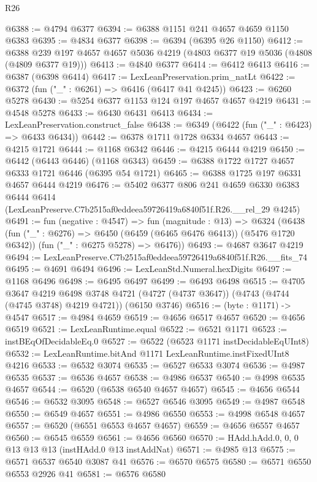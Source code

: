 \begin{lexlean}{R26}
\begin{coremodule}
@6388 := @4794 @6377
@6394 := @6388 @1151 @241 @4657 @4659 @1150 @6383
@6395 := @4834 @6377
@6398 := @6394 (@6395 @26 @1150)
@6412 := @6388 @239 @197 @4657 @4657 @5036 @4219 (@4803 @6377 @19 @5036 (@4808 (@4809 @6377 @19)))
@6413 := @4840 @6377
@6414 := @6412 @6413
@6416 := @6387 (@6398 @6414)
@6417 := LexLeanPreservation.prim_natLt
@6422 := @6372 (fun ("_" : @6261) => @6416 (@6417 @41 @4245))
@6423 := @6260 @5278
@6430 := @5254 @6377 @1153 @124 @197 @4657 @4657 @4219
@6431 := @4548 @5278
@6433 := @6430 @6431 @6413
@6434 := LexLeanPreservation.construct_false
@6438 := @6349 (@6422 (fun ("_" : @6423) => @6433 @6434))
@6442 := @6378 @1711 @1728 @6334 @4657
@6443 := @4215 @1721
@6444 := @1168 @6342
@6446 := @4215 @6444 @4219
@6450 := @6442 (@6443 @6446) (@1168 @6343)
@6459 := @6388 @1722 @1727 @4657 @6333 @1721 @6446 (@6395 @54 @1721)
@6465 := @6388 @1725 @197 @6331 @4657 @6444 @4219
@6476 := @5402
    @6377
    @806
    @241
    @4659
    @6330
    @6383
    @6444
    @6414
    (LexLeanPreserve.C7b2515af0eddeea59726419a6840f51f.R26.__rel_29 @4245)
@6491 := fun (negative : @4547) =>
  fun (magnitude : @13) =>
  @6324
    (@6438
      (fun ("_" : @6276) => @6450 (@6459 (@6465 @6476 @6413)) (@5476 @1720 @6342))
      (fun ("_" : @6275 @5278) => @6476))
@6493 := @4687 @3647 @4219
@6494 := LexLeanPreserve.C7b2515af0eddeea59726419a6840f51f.R26.__fits_74
@6495 := @4691 @6494
@6496 := LexLeanStd.Numeral.hexDigits
@6497 := @1168 @6496
@6498 := @6495 @6497
@6499 := @6493 @6498
@6515 := @4705
    @3647
    @4219
    @6498
    @3748
    @4721
    (@4727 (@4737 @3647))
    (@4743 (@4744 (@4745 @3748) @4219 @4721))
    (@6150 @3746)
@6516 := (byte : @1171) -> @4547
@6517 := @4984 @4659
@6519 := @4656 @6517 @4657
@6520 := @4656 @6519
@6521 := LexLeanRuntime.equal
@6522 := @6521 @1171
@6523 := instBEqOfDecidableEq.{0}
@6527 := @6522 (@6523 @1171 instDecidableEqUInt8)
@6532 := LexLeanRuntime.bitAnd @1171 LexLeanRuntime.instFixedUInt8 @4216
@6533 := @6532 @3074
@6535 := @6527 @6533 @3074
@6536 := @4987 @6535
@6537 := @6536 @4657
@6538 := @4986 @6537
@6540 := @4998 @6535 @4657
@6544 := @6520 (@6538 @6540 @4657 @4657)
@6545 := @4656 @6544
@6546 := @6532 @3095
@6548 := @6527 @6546 @3095
@6549 := @4987 @6548
@6550 := @6549 @4657
@6551 := @4986 @6550
@6553 := @4998 @6548 @4657
@6557 := @6520 (@6551 @6553 @4657 @4657)
@6559 := @4656 @6557 @4657
@6560 := @6545 @6559
@6561 := @4656 @6560
@6570 := HAdd.hAdd.{0, 0, 0} @13 @13 @13 (instHAdd.{0} @13 instAddNat)
@6571 := @4985 @13
@6575 := @6571 @6537 @6540 @3087 @41
@6576 := @6570 @6575
@6580 := @6571 @6550 @6553 @2926 @41
@6581 := @6576 @6580

\end{coremodule}
\end{lexlean}

